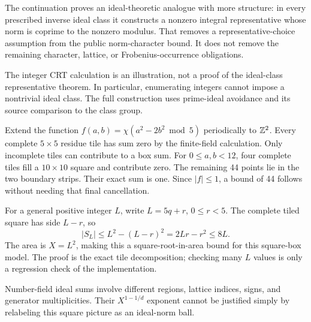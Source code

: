 The continuation proves an ideal-theoretic analogue with more structure: in every prescribed inverse ideal class it constructs a nonzero integral representative whose norm is coprime to the nonzero modulus. That removes a representative-choice assumption from the public norm-character bound. It does not remove the remaining character, lattice, or Frobenius-occurrence obligations.

The integer CRT calculation is an illustration, not a proof of the ideal-class representative theorem. In particular, enumerating integers cannot impose a nontrivial ideal class. The full construction uses prime-ideal avoidance and its source comparison to the class group.

Extend the function $f(a,b)=\chi(a^2-2b^2\bmod5)$ periodically to $\mathbb Z^2$. Every complete $5\times5$ residue tile has sum zero by the finite-field calculation. Only incomplete tiles can contribute to a box sum.
For $0\le a,b<12$, four complete tiles fill a $10\times10$ square and contribute zero. The remaining 44 points lie in the two boundary strips. Their exact sum is one. Since $|f|\le1$, a bound of 44 follows without needing that final cancellation.

For a general positive integer $L$, write $L=5q+r$, $0\le r<5$. The complete tiled square has side $L-r$, so
\[
|S_L|\le L^2-(L-r)^2=2Lr-r^2\le8L.
\]
The area is $X=L^2$, making this a square-root-in-area bound for this square-box model. The proof is the exact tile decomposition; checking many $L$ values is only a regression check of the implementation.

Number-field ideal sums involve different regions, lattice indices, signs, and generator multiplicities. Their $X^{1-1/d}$ exponent cannot be justified simply by relabeling this square picture as an ideal-norm ball.

